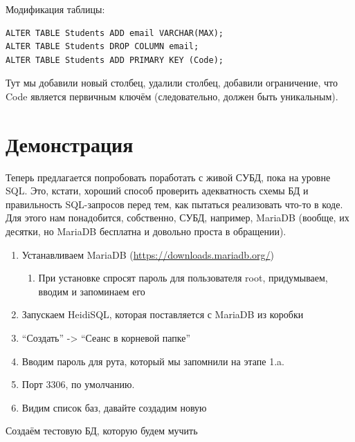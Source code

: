 \documentclass[a5paper]{article}
\begin{document}
Модификация таблицы:

\begin{verbatim}
ALTER TABLE Students ADD email VARCHAR(MAX);
ALTER TABLE Students DROP COLUMN email;
ALTER TABLE Students ADD PRIMARY KEY (Code);
\end{verbatim}

Тут мы добавили новый столбец, удалили столбец, добавили ограничение, что Code является первичным ключём (следовательно, должен быть уникальным).

\section{Демонстрация}

Теперь предлагается попробовать поработать с живой СУБД, пока на уровне SQL. Это, кстати, хороший способ проверить адекватность схемы БД и правильность SQL-запросов перед тем, как пытаться реализовать что-то в коде. Для этого нам понадобится, собственно, СУБД, например, MariaDB (вообще, их десятки, но MariaDB бесплатна и довольно проста в обращении).

\begin{enumerate}
	\item Устанавливаем MariaDB (\url{https://downloads.mariadb.org/})
	\begin{enumerate}
		\item При установке спросят пароль для пользователя root, придумываем, вводим и запоминаем его
	\end{enumerate}
	\item Запускаем HeidiSQL, которая поставляется с MariaDB из коробки
	\item ``Создать'' -> ``Сеанс в корневой папке''
	\item Вводим пароль для рута, который мы запомнили на этапе 1.a.
	\item Порт 3306, по умолчанию.
	\item Видим список баз, давайте создадим новую
\end{enumerate}

Создаём тестовую БД, которую будем мучить
\end{document}
